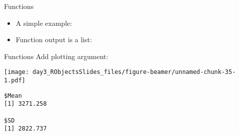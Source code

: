 \documentclass[
  ignorenonframetext,
]{beamer}
\newenvironment{Shaded}{\begin{snugshade}}{\end{snugshade}}
\newcommand{\AttributeTok}[1]{\textcolor[rgb]{0.77,0.63,0.00}{#1}}
\newcommand{\ConstantTok}[1]{\textcolor[rgb]{0.00,0.00,0.00}{#1}}
\newcommand{\DecValTok}[1]{\textcolor[rgb]{0.00,0.00,0.81}{#1}}
\newcommand{\FloatTok}[1]{\textcolor[rgb]{0.00,0.00,0.81}{#1}}
\newcommand{\FunctionTok}[1]{\textcolor[rgb]{0.00,0.00,0.00}{#1}}
\newcommand{\NormalTok}[1]{#1}
\newcommand{\SpecialCharTok}[1]{\textcolor[rgb]{0.00,0.00,0.00}{#1}}
\providecommand{\tightlist}{%
  \setlength{\itemsep}{0pt}\setlength{\parskip}{0pt}}
\begin{document}
\begin{frame}[fragile]{Functions}
\protect\hypertarget{functions-4}{}
\begin{itemize}[<+->]
\tightlist
\item
  A simple example:
\end{itemize}

\begin{Shaded}
\end{Shaded}

\begin{itemize}[<+->]
\tightlist
\item
  Function output is a list:
\end{itemize}

\begin{Shaded}
\end{Shaded}
\end{frame}

\begin{frame}[fragile]{Functions}
\protect\hypertarget{functions-5}{}
Add plotting argument:

\begin{Shaded}
\end{Shaded}

\texttt{[image: day3\_RObjectsSlides\_files/figure-beamer/unnamed-chunk-35-1.pdf]}

\begin{verbatim}
$Mean
[1] 3271.258

$SD
[1] 2822.737
\end{verbatim}
\end{frame}
\end{document}
